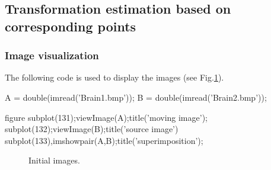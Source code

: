 \def\QRCODE{TB_image_TUT.IMG.image_registration_matlabqrcode.png}
\def\QRPAGE{http://www.iptutorials.science/tree/master/TB_image/TUT.IMG.image_registration/matlab}

\subsection{Transformation estimation based on corresponding points}
\subsubsection{Image visualization}
The following code is used to display the images (see Fig.\ref{fig:registration:matlab:initial}).

\begin{matlab}
A = double(imread('Brain1.bmp'));
B = double(imread('Brain2.bmp'));

figure
subplot(131);viewImage(A);title('moving image');
subplot(132);viewImage(B);title('source image')
subplot(133),imshowpair(A,B);title('superimposition');
\end{matlab}

\begin{figure}[htbp]
\centering
 \hfill
 \hfill
 \caption{Initial images.}
 \label{fig:registration:matlab:initial}
\end{figure}

